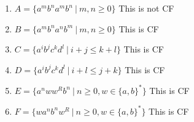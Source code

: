 \documentclass[11pt]{article}
\begin{document}
\begin{enumerate}
\begin{enumerate}
\item $A=\{a^mb^na^mb^n\ |\ m,n\ge0\}$
\newline This is not CF
\item $B=\{a^mb^na^nb^m\ |\ m,n\ge0\}$
\newline This is CF
\item $C=\{a^ib^jc^kd^l\ |\ i+j\le k+l\}$
\newline This is CF
\item $D=\{a^ib^jc^kd^l\ |\ i+l\le j+k\}$
\newline This is CF
\item $E=\{a^nww^Rb^n\ |\ n\ge0, w\in\{a, b\}^*\}$
\newline This is CF
\item $F=\{wa^nb^nw^R\ |\ n\ge0, w\in\{a, b\}^*\}$
\newline This is CF
\end{enumerate}

\end{enumerate}
\end{document}
